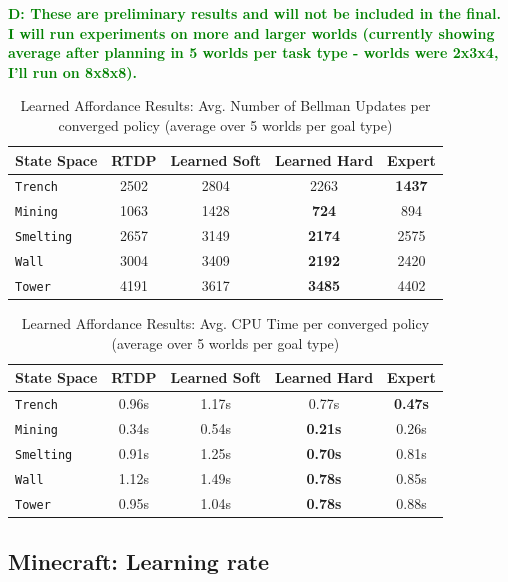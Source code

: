 \documentclass[conference]{IEEEtran}
\newcommand{\dnote}[1]{\textcolor{Green}{\textbf{D: #1}}}
\begin{document}
\dnote{These are preliminary results and will not be included in the final. I will run experiments on more and larger worlds (currently showing average after planning in 5 worlds per task type - worlds were 2x3x4, I'll run on 8x8x8).}

\begin{table}[H]
\centering
\begin{tabular}{ l || c c c c }
  State Space & RTDP & Learned Soft & Learned Hard & Expert 	 	\\ \hline
  \texttt{Trench}  	& 	2502	&	2804		&	2263	&	{\bf 1437}	\\
  \texttt{Mining}  	& 	1063	&	1428		&	{\bf 724}	&	894  \\
  \texttt{Smelting}  	& 	2657	&	3149		&	{\bf 2174}	&	2575  \\
  \texttt{Wall}  		& 	3004	&	3409		&	{\bf 2192}	&	2420\\
  \texttt{Tower}  		& 	4191	&	3617		&	{\bf 3485}	&	4402 \\
\end{tabular}
\caption{Learned Affordance Results: Avg. Number of Bellman Updates per converged policy (average over 5 worlds per goal type)}
\label{table:minecraft_results_bellman}
\end{table}

\begin{table}[H]
\centering
\begin{tabular}{ l || c c c c }
  State Space & RTDP & Learned Soft & Learned Hard & Expert 	 	\\ \hline
  \texttt{Trench}  	& 	0.96s	&	1.17s		&	0.77s	&	{\bf 0.47s}	\\
  \texttt{Mining}  	& 	0.34s	&	0.54s		&	{\bf 0.21s}	&	0.26s  \\
  \texttt{Smelting}  	& 	0.91s	&	1.25s		&	{\bf 0.70s}	&	0.81s  \\
  \texttt{Wall}  		& 	1.12s	&	1.49s		&	{\bf 0.78s}	&	0.85s\\
  \texttt{Tower}  		& 	0.95s	&	1.04s		&	{\bf 0.78s}	&	0.88s \\
\end{tabular}
\caption{Learned Affordance Results: Avg. CPU Time per converged policy (average over 5 worlds per goal type)}
\label{table:minecraft_results_bellman}
\end{table}

\subsection{Minecraft: Learning rate}
\end{document}
